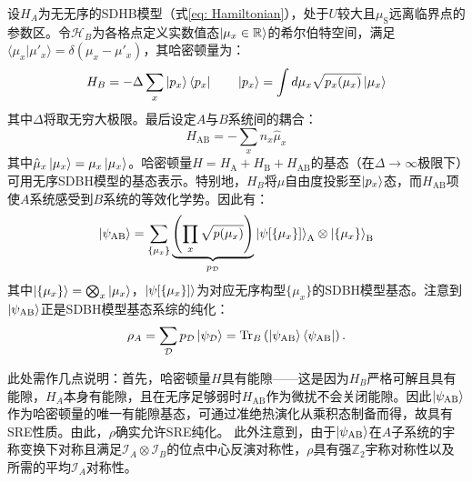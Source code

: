 \documentclass[preprint,superscriptaddress,floatfix,nofootinbib]{revtex4-2}
\begin{document}
设$H_A$为无无序的SDHB模型（式\eqref{eq: Hamiltonian}），处于$U$较大且$\mu_{\text{S}}$远离临界点的参数区。令$\mathcal{H}_B$为各格点定义实数值态$\ket{\mu_x \in \mathbb{R}}$的希尔伯特空间，满足$\langle \mu_x|\mu'_x\rangle =  \delta(\mu_x - \mu'_x)$，其哈密顿量为：
\begin{equation}
    H_{B} = -\Delta \sum_{x} \ket{p_x} \bra{p_x} \qquad \ket{p_x} = \int d\mu_x \sqrt{p_x(\mu_x)} \ket{\mu_x}
\end{equation}
其中$\Delta$将取无穷大极限。最后设定$A$与$B$系统间的耦合：
\begin{equation}
    H_{\text{AB}} = - \sum_{x} n_x \hat{\mu}_x
\end{equation}
其中$\hat{\mu}_x \ket{\mu_x} = \mu_x \ket{\mu_x}$。哈密顿量$H = H_{\text{A}} + H_{\text{B}} + H_{\text{AB}}$的基态（在$\Delta \to \infty$极限下）可用无序SDBH模型的基态表示。特别地，$H_B$将$\mu$自由度投影至$\ket{p_x}$态，而$H_{\text{AB}}$项使$A$系统感受到$B$系统的等效化学势。因此有：
\begin{equation}
    \ket{\psi_{\text{AB}}} = \sum_{\{\mu_x\}} \underbrace{\left(\prod_{x} \sqrt{p(\mu_x)} \right)}_{p_{\mathcal{D}}} \ket{\psi[\{\mu_x\}]}_{\text{A}} \otimes \ket{\{\mu_x\}}_{\text{B}}
\end{equation}
其中$\ket{\{\mu_x\}} = \bigotimes_x\ket{\mu_x}$，$\ket{\psi[\{\mu_x\}]}$为对应无序构型$\{\mu_x\}$的SDBH模型基态。注意到$\ket{\psi_{\text{AB}}}$正是SDBH模型基态系综的纯化：
\begin{equation}
    \rho_A = \sum_{\mathcal{D}} p_{\mathcal{D}} \ket{\psi_{\mathcal{D}}} = \text{Tr}_B\left(\ket{\psi_{\text{AB}}}\bra{\psi_{\text{AB}}}\right).
\end{equation}

此处需作几点说明：首先，哈密顿量$H$具有能隙——这是因为$H_B$严格可解且具有能隙，$H_A$本身有能隙，且在无序足够弱时$H_{\text{AB}}$作为微扰不会关闭能隙。因此$\ket{\psi_{\text{AB}}}$作为哈密顿量的唯一有能隙基态，可通过准绝热演化从乘积态制备而得，故具有SRE性质。由此，$\rho$确实允许SRE纯化。
此外注意到，由于$\ket{\psi_{\text{AB}}}$在$A$子系统的宇称变换下对称且满足$\mathcal{I}_A \otimes \mathcal{I}_B$的位点中心反演对称性，$\rho$具有强$\mathbb{Z}_2$宇称对称性以及所需的平均$\mathcal{I}_A$对称性。
\end{document}
